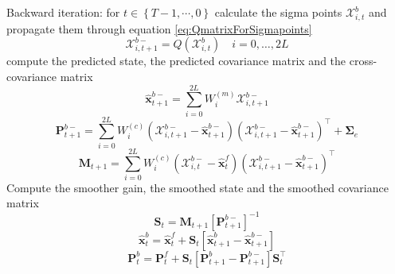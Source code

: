 \documentclass[10pt,a4paper]{article}
\begin{document}
\begin{algorithm}
\begin{small}
\begin{algorithmic}[1]
		\State Backward iteration: for $t \in \left\lbrace T-1, \cdots, 0 \right\rbrace $ calculate the sigma points $\mathcal X_{i,t}^b$ and propagate them through equation \ref{eq:QmatrixForSigmapoints}
		\begin{equation*}
			\mathcal X_{i,t+1}^{b-}=Q(\mathcal X_{i,t}^b) \quad i=0, \dots, 2L
		\end{equation*}
		 compute the predicted state, the predicted covariance matrix and the cross-covariance matrix
		\begin{equation*}
			\hat{\mathbf x}_{t+1}^{b-}=\sum_{i=0}^{2L} W_i^{(m)}\mathcal X_{i,t+1}^{b-} 
		\end{equation*}
		\begin{equation*}
			\mathbf P_{t +1}^{b-}=\sum_{i=0}^{2L} W_i^{(c)}(\mathcal X_{i,t+1}^{b-}-\hat{\mathbf x}_{t +1}^{b-})(\mathcal X_{i,t+1}^{b-}-\hat{\mathbf x}_{t +1}^{b-})^\top+\boldsymbol \Sigma_e 
		\end{equation*}
		\begin{equation*}
			\mathbf M_{t +1}=\sum_{i=0}^{2L} W_i^{(c)}(\mathcal X_{i,t}^{b-}-\hat{\mathbf x}_{t}^{f})(\mathcal X_{i,t+1}^{b-}-\hat{\mathbf x}_{t+1}^{b-})^\top 
		\end{equation*}
		 Compute the smoother gain, the smoothed state and the smoothed covariance matrix
		\begin{equation*}
			\mathbf S_t=\mathbf M_{t +1}\left[ \mathbf P_{t +1}^{b-}\right] ^{-1} 
		\end{equation*}
		\begin{equation*}
			\hat{\mathbf x}_t^b=\hat{\mathbf x}_t^f+\mathbf S_t\left[\hat{\mathbf x}_{t+1}^{b}-\hat{\mathbf x}_{t+1}^{b-}\right] 
		\end{equation*}
		\begin{equation*}
			\mathbf P_{t}^{b}=\mathbf P_{t}^{f}+\mathbf S_t\left[\mathbf P_{t+1}^{b}-\mathbf P_{t+1}^{b-} \right]\mathbf S_t^\top 
		\end{equation*}
	\end{algorithmic}
\end{small}
\end{algorithm}
\end{document}
